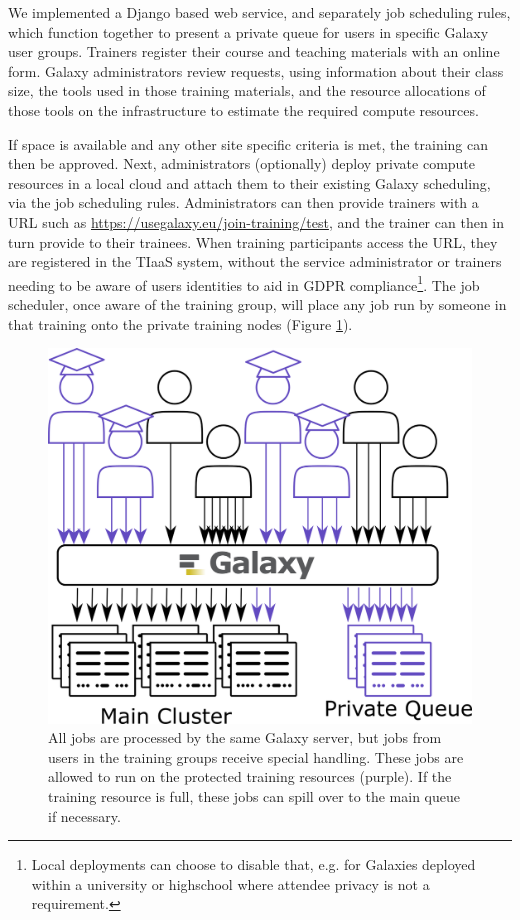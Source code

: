 \documentclass[a4paper,num-refs]{oup-contemporary}
\begin{document}
We implemented a Django based web service, and separately job scheduling rules, which function together to present a private queue for users in specific Galaxy user groups. Trainers register their course and teaching materials with an online form. Galaxy administrators review requests, using information about their class size, the tools used in those training materials, and the resource allocations of those tools on the infrastructure to estimate the required compute resources.

If space is available and any other site specific criteria is met, the training can then be approved. Next, administrators (optionally) deploy private compute resources in a local cloud and attach them to their existing Galaxy scheduling, via the job scheduling rules. Administrators can then provide trainers with a URL such as \url{https://usegalaxy.eu/join-training/test}, and the trainer can then in turn provide to their trainees. When training participants access the URL, they are registered in the TIaaS system, without the service administrator or trainers needing to be aware of users identities to aid in GDPR compliance\footnote{Local deployments can choose to disable that, e.g. for Galaxies deployed within a university or highschool where attendee privacy is not a requirement.}. The job scheduler, once aware of the training group, will place any job run by someone in that training onto the private training nodes (Figure \ref{figure:queue}).

\begin{figure}[bt!]
\centering
\includegraphics[width=\linewidth]{images/rules.png}
\caption{All jobs are processed by the same Galaxy server, but jobs from users in the training groups receive special handling. These jobs are allowed to run on the protected training resources (purple). If the training resource is full, these jobs can spill over to the main queue if necessary.}\label{figure:queue}
\end{figure}
\end{document}
